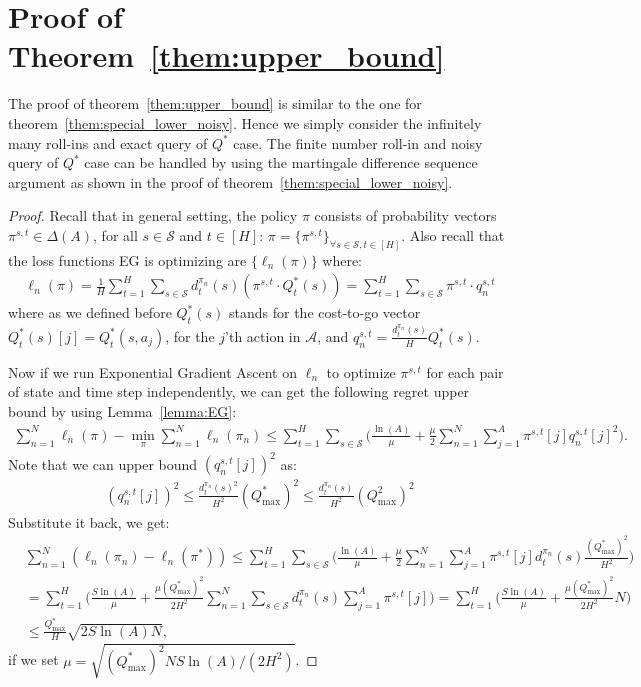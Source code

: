 \documentclass{article}
\begin{document}
\section{Proof of Theorem~\ref{them:upper_bound}}
\label{sec:proof_upper_bound}
The proof of theorem~\ref{them:upper_bound} is similar to the one for theorem~\ref{them:special_lower_noisy}. Hence we simply consider the infinitely many roll-ins and exact query of $Q^*$ case. The finite number roll-in and noisy query of $Q^*$ case can be handled by using the martingale difference sequence argument as shown in the proof of theorem~\ref{them:special_lower_noisy}.

\begin{proof}
Recall that in general setting, the policy $\pi$ consists of probability vectors $\pi^{s,t}\in\Delta(A)$, for all $s\in\mathcal{S}$ and $t\in[H]$: $\pi = \{\pi^{s,t}\}_{\forall s\in \mathcal{S},t\in[H]}$. Also recall that the loss functions EG is optimizing are $\{\ell_n(\pi)\}$ where:
\begin{align}
\ell_n(\pi) = \frac{1}{H}\sum_{t=1}^H\sum_{s\in\mathcal{S}} d_t^{\pi_n}(s) (\pi^{s,t}\cdot Q_t^*(s)) = \sum_{t=1}^H\sum_{s\in\mathcal{S}}\pi^{s,t}\cdot q_n^{s,t}
\end{align} where as we defined before $Q_t^*(s)$ stands for the cost-to-go vector $Q_t^*(s)[j] = Q_t^*(s,a_j)$, for the $j$'th action in $\mathcal{A}$, and $q_n^{s,t} = \frac{d_t^{\pi_n}(s)}{H}Q_t^*(s)$.  


Now if we run Exponential Gradient Ascent on $\ell_n$ to optimize $\pi^{s,t}$ for each pair of state and time step independently, we can get the following regret upper bound by using Lemma~\ref{lemma:EG}:
\begin{align}
\sum_{n=1}^N \ell_n(\pi) - \min_{\pi}\sum_{n=1}^N\ell_n(\pi_n) \leq \sum_{t=1}^H\sum_{s\in\mathcal{S}}\big( \frac{\ln(A)}{\mu} + \frac{\mu}{2}\sum_{n=1}^N\sum_{j=1}^A \pi^{s,t}[j] q_n^{s,t}[j]^2\big).
\end{align} Note that we can upper bound $(q_n^{s,t}[j])^2$ as:
\begin{align}
(q_n^{s,t}[j])^2 \leq \frac{d_t^{\pi_n}(s)^2}{H^2}(Q^*_{\max})^2 \leq \frac{d_t^{\pi_n}(s)}{H^2} (Q^2_{\max})^2 
\end{align}
Substitute it back, we get:
\begin{align}
&\sum_{n=1}^N (\ell_n(\pi_n) - \ell_n(\pi^*)) \leq \sum_{t=1}^H\sum_{s\in\mathcal{S}} \big(\frac{\ln(A)}{\mu} + \frac{\mu}{2}\sum_{n=1}^N\sum_{j=1}^A \pi^{s,t}[j] d_t^{\pi_n}(s)\frac{(Q^*_{\max})^2}{H^2} \big) \nonumber\\
& = \sum_{t=1}^H \big(\frac{S\ln(A)}{\mu} + \frac{\mu(Q^*_{\max})^2}{2H^2}\sum_{n=1}^N\sum_{s\in\mathcal{S}}d_t^{\pi_n}(s)\sum_{j=1}^A\pi^{s,t}[j]\big) = \sum_{t=1}^H \big( \frac{S\ln(A)}{\mu} + \frac{\mu(Q^*_{\max})^2}{2H^2}N\big) \nonumber\\
& \leq \frac{Q^*_{\max}}{H}\sqrt{2S\ln(A)N},
\end{align} if we set $\mu = \sqrt{(Q^*_{\max})^2NS\ln(A)/(2H^2)}$.


\end{proof}
\end{document}
